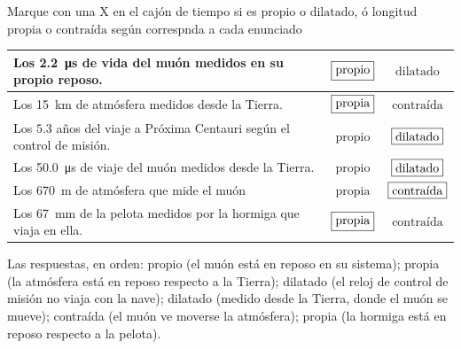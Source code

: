 \documentclass[12pt, a4paper]{article}
\renewcommand{\arraystretch}{1.9}
\begin{document}
\begin{exercise}[ID=propio, subtitle={¿Tiempo propio o dilatado? ¿Longitud propia o contraída?}, tags={parcial1}, nuevapagina=true]
Marque con una X en el cajón de tiempo si es
 $\boxed{\text{propio}}$ o $\boxed{\text{dilatado}}$,
 ó longitud $\boxed{\text{propia}}$ o $\boxed{\text{contraída}}$
 según correspnda a cada enunciado
 
\begin{center}
\renewcommand{\arraystretch}{1.8}
\begin{tabularx}{\textwidth}{@{}>{\raggedright\arraybackslash}X  c c@{}}
\toprule
Los \qty{2.2}{\micro\second} de vida del muón medidos en su propio reposo.
      & $\boxed{\color{black}\text{propio}}$ & $\boxed{\text{dilatado}}$  \\\hline
Los \qty{15}{\kilo\metre} de atmósfera medidos desde la Tierra.
      & $\boxed{\color{black}\text{propia}}$ & $\boxed{\text{contraída}}$  \\\hline
Los $5.3$ años del viaje a Próxima Centauri según el control de misión.
      & $\boxed{\text{propio}}$ & $\boxed{\color{black}\text{dilatado}}$  \\\hline
Los \qty{50.0}{\micro\second} de viaje del muón medidos desde la Tierra.
      & $\boxed{\text{propio}}$ & $\boxed{\color{black}\text{dilatado}}$  \\\hline
Los \qty{670}{\metre} de atmósfera que mide el muón
      & $\boxed{\text{propia}}$ & $\boxed{\color{black}\text{contraída}}$  \\\hline
Los \qty{67}{\milli\metre}  de la pelota medidos por la hormiga que viaja en ella.
      & $\boxed{\color{black}\text{propia}}$ & $\boxed{\text{contraída}}$  \\
\bottomrule
\end{tabularx}
\end{center}
\end{exercise}
\begin{solution}
Las respuestas, en orden: propio (el muón está en reposo en su sistema); propia (la atmósfera está en reposo respecto a la Tierra); dilatado (el reloj de control de misión no viaja con la nave); dilatado (medido desde la Tierra, donde el muón se mueve); contraída (el muón ve moverse la atmósfera); propia (la hormiga está en reposo respecto a la pelota).
\end{solution}
\end{document}
